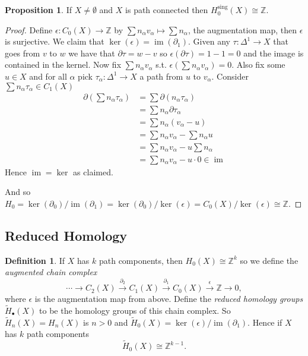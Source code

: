 \documentclass[12pt]{article}
\theoremstyle{definition}
\newtheorem*{prop}{Proposition}
\theoremstyle{definition}
\newtheorem*{defn}{Definition}
\newcommand{\ZZ}{\mathbb{Z}}
\renewcommand{\H}{H_\bullet}
\DeclareMathOperator{\im}{im}
\begin{document}
\begin{prop}
If $X \ne \emptyset$ and $X$ is path connected then $H_0^\text{sing}(X) \cong \ZZ$.
\end{prop}
\begin{proof}
Define $\epsilon\colon C_0(X) \to \ZZ$ by $\sum n_\alpha v_\alpha \mapsto \sum n_\alpha$, the augmentation map, then $\epsilon$ is surjective.
We claim that $\ker(\epsilon) = \im(\partial_1)$.
Given any $\tau\colon \Delta^1 \to X$ that goes from $v$ to $w$ we have that $\partial\tau = w-v$ so $\epsilon(\partial \tau) = 1-1 =0$ and the image is contained in the kernel.
Now fix $\sum n_\alpha v_\alpha$ s.t. $\epsilon(\sum n_\alpha v_\alpha) = 0$.
Also fix some $u\in X$ and for all $\alpha$ pick $\tau_\alpha\colon\Delta^1 \to X$ a path from $u$ to $v_\alpha$.
Consider $\sum n_\alpha \tau_\alpha\in C_1 (X)$
\begin{align*}
\partial(\sum n_\alpha \tau_\alpha) &= \sum \partial(n_\alpha \tau_\alpha)\\
&= \sum n_\alpha\partial\tau_\alpha\\
&= \sum n_\alpha(v_\alpha - u) \\
&= \sum n_\alpha v_\alpha - \sum n_\alpha u \\
&= \sum n_\alpha v_\alpha - u\sum n_\alpha \\
&= \sum n_\alpha v_\alpha -u\cdot 0\in \im
\end{align*}
Hence $\im = \ker$ as claimed.

And so $H_0 = \ker(\partial_0)/\im(\partial_1) = \ker(\partial_0)/\ker(\epsilon) = C_0(X) /\ker(\epsilon) \cong \ZZ$.
\end{proof}

\subsection{Reduced Homology}
\begin{defn}
If $X$ has $k$ path components, then $H_0(X) \cong \ZZ^k$ so we define the \emph{augmented chain complex}
\[
\cdots \to C_2(X) \xrightarrow{\partial_2}C_1(X) \xrightarrow{\partial_1}C_0(X) \xrightarrow{\epsilon} \ZZ \to 0,
\]
where $\epsilon$ is the augmentation map from above.
Define the \emph{reduced homology groups} $\tilde \H (X)$ to be the homology groups of this chain complex.
So $\tilde H_n(X) = H_n(X)$ is $n> 0$ and $\tilde H_0(X) = \ker(\epsilon)/\im(\partial_1)$.
Hence if $X$ has $k$ path components
\[
\tilde H_0(X) \cong \ZZ^{k-1}.
\]
\end{defn}
\end{document}
